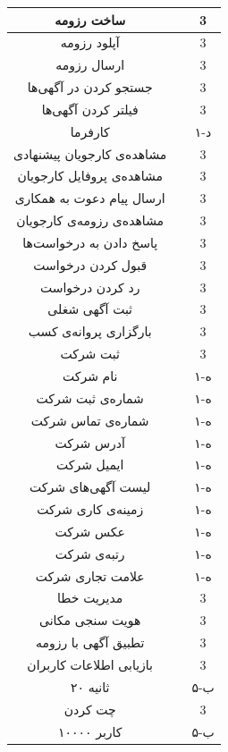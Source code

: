\documentclass[12pt,svgnames,oneside]{book}
\newcommand{\myc}{\lr{C}}
\newcommand{\mya}{\lr{A}}
\newcommand{\asjs}{\lr{AS(job seeker, system)}}
\newcommand{\asje}{\lr{AS(job seeker, the employer)}}
\newcommand{\ases}{\lr{AS(the employer, system)}}
\newcommand{\asej}{\lr{AS(the employer, job seeker)}}
\newcommand{\aser}{\lr{AS(the employer, requests)}}
\newcommand{\asser}{\lr{AS(system, errors)}}
\newcommand{\asse}{\lr{AS(system, the employer)}}
\newcommand{\assj}{\lr{AS(system, job seeker)}}
\newcommand{\assu}{\lr{AS(system, user)}}
\newcommand{\myv}{\lr{V}}
\newcommand{\oneh}{۱-ه}
\newcommand{\oned}{۱-د}
\newcommand{\fiveb}{۵-ب}
\begin{document}
\begin{longtable}{|c|c|c|}
\hline
ساخت رزومه &
\asjs &
3 \\
\hline
آپلود رزومه &
\asjs &
3 \\
\hline
ارسال رزومه &
\asje &
3 \\
\hline
 جستجو کردن در آگهی‌ها &
\asjs &
3 \\
\hline
فیلتر کردن آگهی‌ها &
\asjs &
3 \\
\hline
کارفرما &
\myc &
\oned \\
\hline
مشاهده‌ی کارجویان پیشنهادی &
\ases &
3 \\
\hline
مشاهده‌ی پروفایل کارجویان &
\ases &
3 \\
\hline
ارسال پیام دعوت به همکاری &
\asej &
3 \\
\hline
مشاهده‌ی رزومه‌ی کارجویان &
\ases &
3 \\
\hline
پاسخ دادن به درخواست‌ها &
\aser &
3 \\
\hline
قبول کردن درخواست &
\aser &
3 \\
\hline
رد کردن درخواست &
\aser &
3 \\
\hline
ثبت آگهی‌ شغلی &
\ases &
3 \\
\hline
بارگزاری پروانه‌ی کسب &
\ases &
3 \\
\hline
ثبت شرکت & 
\ases & 
3 \\
\hline
نام شرکت & 
\mya & 
\oneh \\
\hline
شماره‌ی ثبت شرکت & 
\mya & 
\oneh \\
\hline
شماره‌ی تماس شرکت & 
\mya & 
\oneh \\
\hline
آدرس شرکت & 
\mya & 
\oneh \\
\hline
ایمیل شرکت & 
\mya & 
\oneh \\
\hline
لیست آگهی‌های شرکت & 
\mya & 
\oneh \\
\hline
زمینه‌ی کاری شرکت & 
\mya & 
\oneh \\
\hline
عکس شرکت & 
\mya & 
\oneh \\
\hline
رتبه‌ی شرکت & 
\mya & 
\oneh \\
\hline
علامت تجاری شرکت & 
\mya & 
\oneh \\
\hline
مدیریت خطا‌& 
\asser & 
3 \\
\hline
هویت سنجی مکانی & 
\asse & 
3 \\
\hline
تطبیق آگهی با رزومه & 
\assj & 
3 \\
\hline
بازیابی اطلاعات کاربران & 
\assu & 
3 \\
\hline
۲۰ ثانیه & 
\myv & 
\fiveb \\
\hline
چت کردن & 
\asje & 
3 \\
\hline
۱۰۰۰۰ کاربر & 
\myv & 
\fiveb \\
\hline
\end{longtable}
\label{table:domain}
\end{document}
